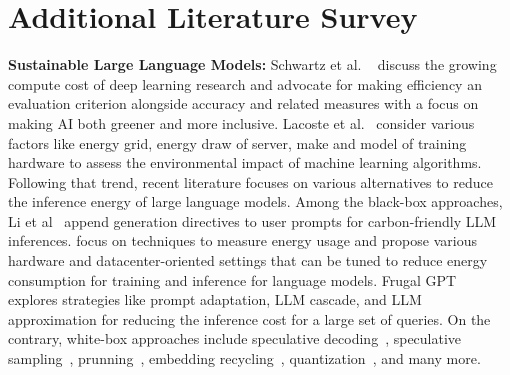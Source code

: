 
\section{Additional Literature Survey}
\label{sec:appen-literature}

\textbf{Sustainable Large Language Models:}
Schwartz et al. ~\cite{schwartz2020green} discuss the growing compute cost of deep learning research and advocate for making efficiency an evaluation criterion alongside accuracy and related measures with a focus on making AI both greener and more inclusive. 
% 
Lacoste et al.~\cite{lacoste2019quantifying} consider various factors like energy grid, energy draw of server, make and model of training hardware to assess the environmental impact of machine learning algorithms. 
%
Following that trend, recent literature focuses on various alternatives to reduce the inference energy of large language models. Among the black-box approaches, Li et al~\cite{li2024toward} append generation directives to user prompts for carbon-friendly LLM inferences. \cite{mcdonald2022great} focus on techniques to measure energy usage and propose various hardware and datacenter-oriented settings that can be tuned to reduce energy consumption for training and inference for language models. Frugal GPT~\cite{chen2023frugalgpt} explores strategies like prompt adaptation, LLM cascade, and LLM approximation for reducing the inference cost for a large set of queries. 
%
On the contrary, white-box approaches include 
speculative decoding~\cite{leviathan2023fast}, speculative sampling~\cite{chen2023accelerating}, prunning~\cite{kurtic2024ziplm}, embedding recycling~\cite{saad2022embedding}, quantization~\cite{bai2022towards,frantar2022gptq,xiao2023smoothquant}, and many more. 


